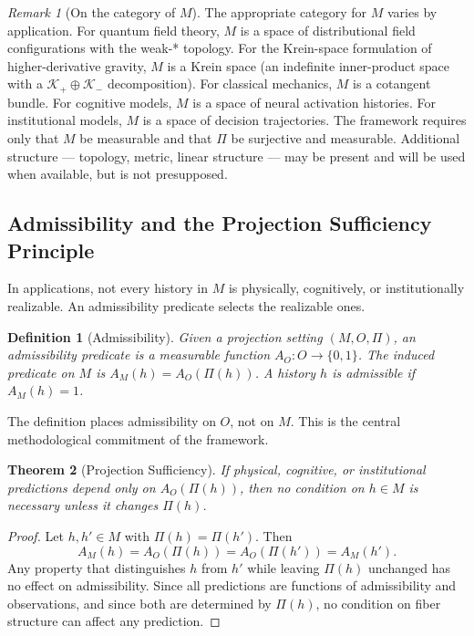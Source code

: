 \documentclass[12pt,a4paper]{article}
\newtheorem{theorem}{Theorem}[section]
\newtheorem{definition}[theorem]{Definition}
\theoremstyle{remark}
\newtheorem{remark}{Remark}[section]
\theoremstyle{definition}
\begin{document}
\begin{remark}[On the category of $M$]
The appropriate category for $M$ varies by application. For quantum field
theory, $M$ is a space of distributional field configurations with the
weak-* topology. For the Krein-space formulation of higher-derivative
gravity, $M$ is a Krein space (an indefinite inner-product space with
a $\mathcal{K}_+ \oplus \mathcal{K}_-$ decomposition). For classical
mechanics, $M$ is a cotangent bundle. For cognitive models, $M$ is a
space of neural activation histories. For institutional models, $M$ is
a space of decision trajectories. The framework requires only that $M$
be measurable and that $\Pi$ be surjective and measurable. Additional
structure --- topology, metric, linear structure --- may be present and
will be used when available, but is not presupposed.
\end{remark}

\subsection{Admissibility and the Projection Sufficiency Principle}

In applications, not every history in $M$ is physically, cognitively, or
institutionally realizable. An admissibility predicate selects the
realizable ones.

\begin{definition}[Admissibility]
Given a projection setting $(M, O, \Pi)$, an \emph{admissibility predicate}
is a measurable function $A_O : O \to \{0,1\}$. The induced predicate
on $M$ is $A_M(h) = A_O(\Pi(h))$. A history $h$ is \emph{admissible} if
$A_M(h) = 1$.
\end{definition}

The definition places admissibility on $O$, not on $M$. This is the
central methodological commitment of the framework.

\begin{theorem}[Projection Sufficiency]
\label{thm:proj_suff}
If physical, cognitive, or institutional predictions depend only on
$A_O(\Pi(h))$, then no condition on $h \in M$ is necessary unless it
changes $\Pi(h)$.
\end{theorem}

\begin{proof}
Let $h, h' \in M$ with $\Pi(h) = \Pi(h')$. Then
\[A_M(h) = A_O(\Pi(h)) = A_O(\Pi(h')) = A_M(h').\] Any property that distinguishes $h$ from $h'$
while leaving $\Pi(h)$ unchanged has no effect on admissibility. Since
all predictions are functions of admissibility and observations, and since
both are determined by $\Pi(h)$, no condition on fiber structure can affect
any prediction.
\end{proof}
\end{document}
